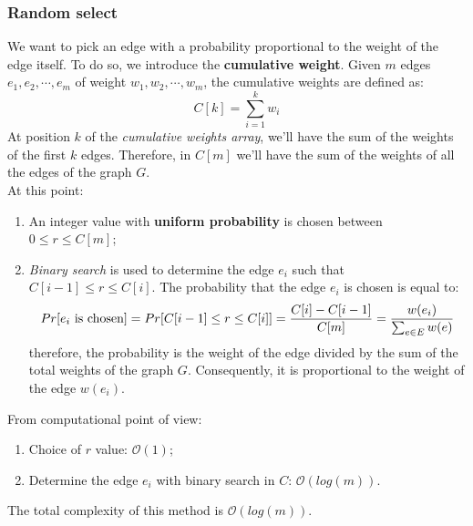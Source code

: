 \subsubsection*{Random select}
We want to pick an edge with a probability proportional to the weight of the edge itself. To do so, we introduce the \textbf{cumulative weight}. Given $m$ edges $e_1, e_2, \cdots , e_m$ of weight $w_1, w_2, \cdots , w_m$, the cumulative weights are defined as:
\[
    C[k] = \sum_{i = 1}^{k} w_i
\]
At position $k$ of the \textit{cumulative weights array}, we'll have the sum of the weights of the first $k$ edges. Therefore, in $C[m]$ we'll have the sum of the weights of all the edges of the graph $G$.\\
At this point:
\begin{enumerate}
    \item An integer value with \textbf{uniform probability} is chosen between $0 \le r \le C[m]$;
    \item \textit{Binary search} is used to determine the edge $e_i$ such that $C[i - 1] \le r \le C[i]$. The probability that the edge $e_i$ is chosen is equal to:
    \[
        Pr[e_i \textnormal{ is chosen}] = Pr[C[i - 1] \le r \le C[i]] = \frac{C[i] - C[i - 1]}{C[m]} = \frac{w(e_i)}{\sum_{e \in E} w(e)}
    \]
    therefore, the probability is the weight of the edge divided by the sum of the total weights of the graph $G$. Consequently, it is proportional to the weight of the edge $w(e_i)$.
\end{enumerate}
\noindent
From computational point of view:
\begin{enumerate}
    \item Choice of $r$ value: $\mathcal{O}(1)$;
    \item Determine the edge $e_i$ with binary search in $C$: $\mathcal{O}(log(m))$.
\end{enumerate}
\noindent
The total complexity of this method is $\mathcal{O}(log(m))$.

